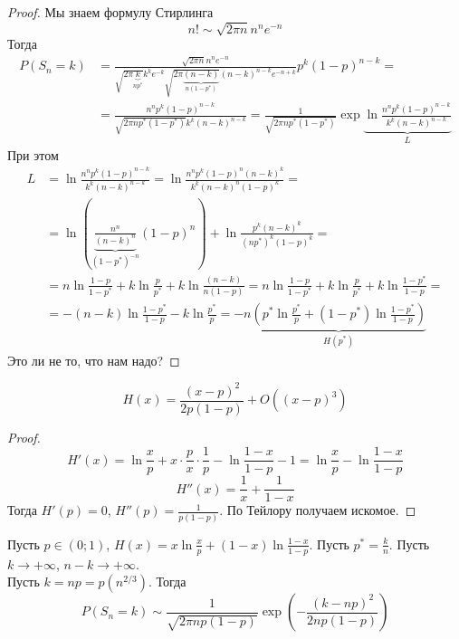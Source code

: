\documentclass{article}
\begin{document}
    \begin{proof}
        Мы знаем формулу Стирлинга
        $$
        n!\sim\sqrt{2\pi n}n^ne^{-n}
        $$
        Тогда
        \[\begin{split}
            P(S_n=k)&=\frac{\sqrt{2\pi n}n^ne^{-n}}{\sqrt{2\pi\underbrace{k}_{np^*}}k^ke^{-k}\sqrt{2\pi\underbrace{(n-k)}_{n(1-p^*)}}(n-k)^{n-k}e^{-n+k}}p^k(1-p)^{n-k}=\\
            &=\frac{n^np^k(1-p)^{n-k}}{\sqrt{2\pi np^*(1-p^*)}k^k(n-k)^{n-k}}=\frac1{\sqrt{2\pi np^*(1-p^*)}}\exp\underbrace{\ln\frac{n^np^k(1-p)^{n-k}}{k^k(n-k)^{n-k}}}_L
        \end{split}\]
        При этом
        \[\begin{split}
            L&=\ln\frac{n^np^k(1-p)^{n-k}}{k^k(n-k)^{n-k}}=\ln\frac{n^np^k(1-p)^n(n-k)^k}{k^k(n-k)^n(1-p)^k}=\\
            &=\ln\left(\underbrace{\frac{n^n}{(n-k)^n}}_{(1-p^*)^{-n}}(1-p)^n\right)+\ln\frac{p^k(n-k)^k}{(np^*)^k(1-p)^k}=\\
            &=n\ln\frac{1-p}{1-p^*}+k\ln\frac{p}{p^*}+k\ln\frac{(n-k)}{n(1-p)}=n\ln\frac{1-p}{1-p^*}+k\ln\frac{p}{p^*}+k\ln\frac{1-p^*}{1-p}=\\
            &=-(n-k)\ln\frac{1-p^*}{1-p}-k\ln\frac{p^*}{p}=-n\underbrace{\left(p^*\ln\frac{p^*}{p}+(1-p^*)\ln\frac{1-p^*}{1-p}\right)}_{H(p^*)}
        \end{split}\]
        Это ли не то, что нам надо?
    \end{proof}
    \begin{lemma}
        $$
        H(x)=\frac{(x-p)^2}{2p(1-p)}+O((x-p)^3)
        $$
    \end{lemma}
    \begin{proof}
        $$
        H'(x)=\ln\frac xp+x\cdot\frac px\cdot\frac1p-\ln\frac{1-x}{1-p}-1=\ln\frac xp-\ln\frac{1-x}{1-p}
        $$
        $$
        H''(x)=\frac1x+\frac1{1-x}
        $$
        Тогда $H'(p)=0$, $H''(p)=\frac1{p(1-p)}$. По Тейлору получаем искомое.
    \end{proof}
    \begin{theorem}
        Пусть $p\in(0;1)$, $H(x)=x\ln\frac xp+(1-x)\ln\frac{1-x}{1-p}$. Пусть $p^*=\frac kn$. Пусть $k\rightarrow+\infty$, $n-k\rightarrow+\infty$.\\
        Пусть $k=np=p(n^{2/3})$. Тогда
        $$
        P(S_n=k)\sim\frac1{\sqrt{2\pi np(1-p)}}\exp\left(-\frac{(k-np)^2}{2np(1-p)}\right)
        $$
    \end{theorem}
\end{document}

